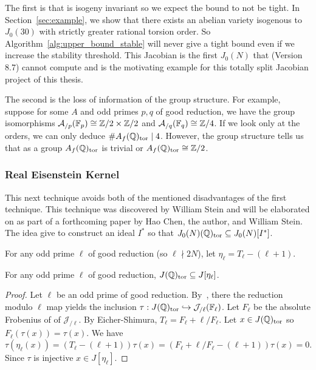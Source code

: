 The first is that is isogeny invariant so we expect the bound to not be tight.
In Section~\ref{sec:example}, we show that there exists an abelian variety isogenous to
$J_0(30)$ with strictly greater rational torsion order. So
Algorithm~\ref{alg:upper_bound_stable} will never give a tight bound even if we
increase the stability threshold. This Jacobian is the first $J_0(N)$ that
\sage (Version 8.7) cannot compute and is the motivating example for this
totally split Jacobian project of this thesis.

The second is the loss of information of the group structure. For example,
suppose for some $A$ and odd primes $p,q$ of good reduction, we have the
group isomorphisms $\mathcal{A}_{/p}(\mathbb{F}_p)\cong \mathbb{Z}/2\times \mathbb{Z}/2$ and
$\mathcal{A}_{/q}(\mathbb{F}_q)\cong \mathbb{Z}/4$. If we look only at the orders, we can only
deduce $\# A_f(\mathbb{Q})_{\mathrm{tor}}\mid 4$. However, the group structure tells us that as
a group $A_f(\mathbb{Q})_{\mathrm{tor}}$ is trivial or $A_f(\mathbb{Q})_{\mathrm{tor}} \cong \mathbb{Z}/2$.

\subsubsection{Real Eisenstein Kernel}%
\label{ssub:real_eisenstein_kernel}

This next technique avoids both of the mentioned disadvantages of the first
technique. This technique was discovered by William Stein and will be
elaborated on as part of a forthcoming paper by Hao Chen, the author, and
William Stein. The idea give to construct an ideal $I^*$ so that
$J_0(N)(\mathbb{Q})_{\mathrm{tor}}\subseteq J_0(N)[I^*]$.

For any odd prime $\ell$ of good reduction (so $\ell\nmid 2N$), let
$\eta_\ell = T_\ell - (\ell+1)$.
\begin{lemma}%
    \label{lem:rational_is_eta}
    For any odd prime $\ell$ of good reduction, $J(\mathbb{Q})_{\mathrm{tor}}\subseteq
    J[\eta_\ell]$.
\end{lemma}
\begin{proof}
    Let $\ell$ be an odd prime of good reduction.
    By~\cite[Appendix]{katz:torsion}, there the reduction modulo $\ell$ map
    yields the inclusion $\tau:J(\mathbb{Q})_{\mathrm{tor}} \hookrightarrow
    \mathcal{J}_{/\ell}(\mathbb{F}_\ell)$. Let $F_\ell$ be the absolute Frobenius of of
    $\mathcal{J}_{/\ell}$. By Eicher-Shimura, $T_\ell=F_\ell+\ell/F_\ell$. Let
    $x\in J(\mathbb{Q})_{\mathrm{tor}}$ so $F_\ell(\tau(x))=\tau(x)$. We have
    \[
        \tau(\eta_\ell(x)) = (T_\ell-(\ell+1))\tau(x) =
        (F_\ell+\ell/F_\ell-(\ell+1))\tau(x) = 0.
    \]
    Since $\tau$ is injective $x\in J[\eta_\ell]$.
\end{proof}

